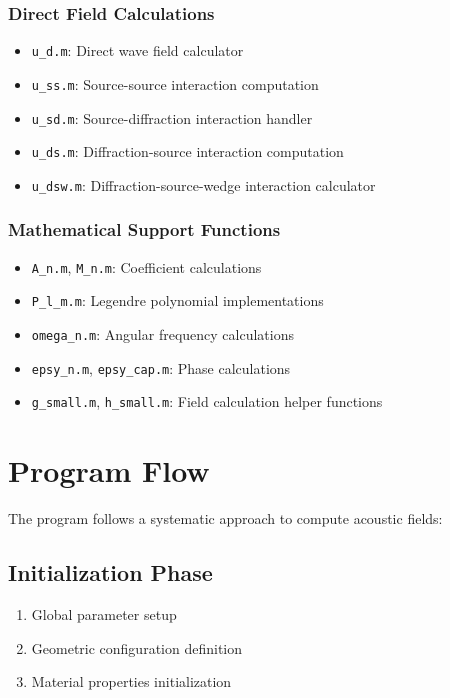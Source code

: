 \documentclass[12pt,a4paper]{article}
\begin{document}
\subsubsection{Direct Field Calculations}
\begin{itemize}
    \item \texttt{u\_d.m}: Direct wave field calculator
    \item \texttt{u\_ss.m}: Source-source interaction computation
    \item \texttt{u\_sd.m}: Source-diffraction interaction handler
    \item \texttt{u\_ds.m}: Diffraction-source interaction computation
    \item \texttt{u\_dsw.m}: Diffraction-source-wedge interaction calculator
\end{itemize}

\subsubsection{Mathematical Support Functions}
\begin{itemize}
    \item \texttt{A\_n.m}, \texttt{M\_n.m}: Coefficient calculations
    \item \texttt{P\_l\_m.m}: Legendre polynomial implementations
    \item \texttt{omega\_n.m}: Angular frequency calculations
    \item \texttt{epsy\_n.m}, \texttt{epsy\_cap.m}: Phase calculations
    \item \texttt{g\_small.m}, \texttt{h\_small.m}: Field calculation helper functions
\end{itemize}

\section{Program Flow}
The program follows a systematic approach to compute acoustic fields:

\subsection{Initialization Phase}
\begin{enumerate}
    \item Global parameter setup
    \item Geometric configuration definition
    \item Material properties initialization
\end{enumerate}
\end{document}
